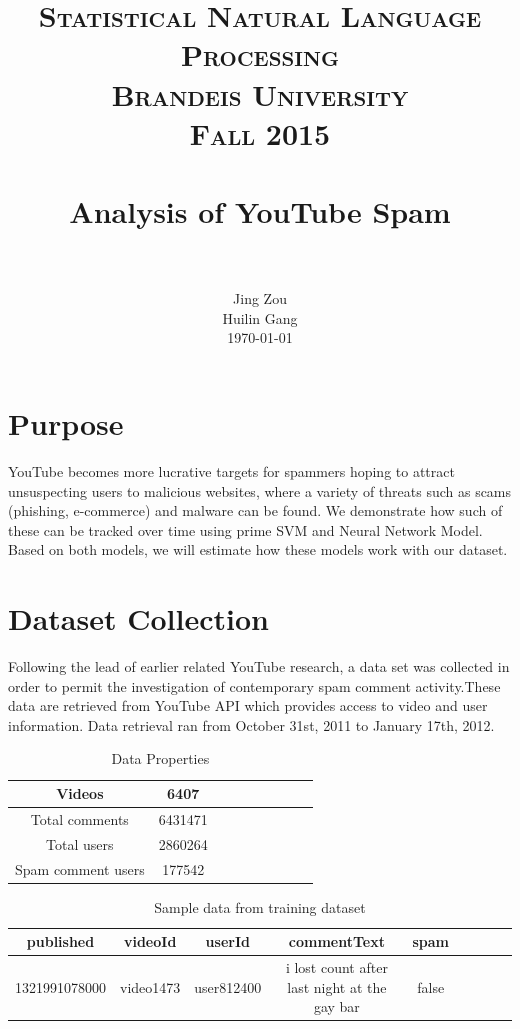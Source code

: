 \documentclass [a4paper, 11pt, oneside, final]{article}
\title{
		\usefont{OT1}{bch}{b}{n}
		\normalfont \Large \textsc{Statistical Natural Language Processing}\\ \textsc{Brandeis University} \\ \textsc{Fall 2015}  \\[25pt]
		\horrule{0.5pt} \\[0.4cm]
		\huge Analysis of YouTube Spam\\
		\horrule{2pt} \\[0.5cm]
}
\author{
	\normalfont 								
	\normalsize
        Jing Zou\\Huilin Gang \\
	\normalsize        
	\today
}
\date{}
\numberwithin{equation}{section}		%
\numberwithin{figure}{section}			%
\numberwithin{table}{section}				%
\begin{document}
\maketitle

\newpage

\section{Purpose}
YouTube becomes more lucrative targets for spammers hoping to attract unsuspecting users to malicious websites, where a variety of threats such as scams (phishing, e-commerce) and malware can be found. We demonstrate how such of these can be tracked over time using prime SVM and Neural Network Model. Based on both models, we will estimate how these models work with our dataset. 
\section{Dataset Collection}
Following the lead of earlier related YouTube research, a data set was collected in order to permit the investigation of contemporary spam comment activity.These data are retrieved from YouTube API which provides access to video and user information. Data retrieval ran from October 31st, 2011 to January 17th, 2012.\\

\begin{table}[h!]
  \begin{center}
    \caption{Data Properties}
    \label{tab:table1}
    \begin{tabular}{ccccccccc}
    \\
    \hline
      Videos & 6407\\
      \hline
     Total comments & 6431471 \\
      \hline
      Total users & 2860264  \\
       \hline  
     Spam comment users & 177542 \\
      \hline
    \end{tabular}
  \end{center}
\end{table}

\begin{table}[h!]
  \begin{center}
    \caption{Sample data from training dataset}
    \label{tab:table1}
    \begin{tabular}{ccccccccc}
    \\
    \hline
      published & videoId & userId & commentText & spam\\
      \hline
     1321991078000 & video1473 & user812400 & i lost count after last night at the gay bar & false \\
    \end{tabular}
  \end{center}
\end{table}
\end{document}
